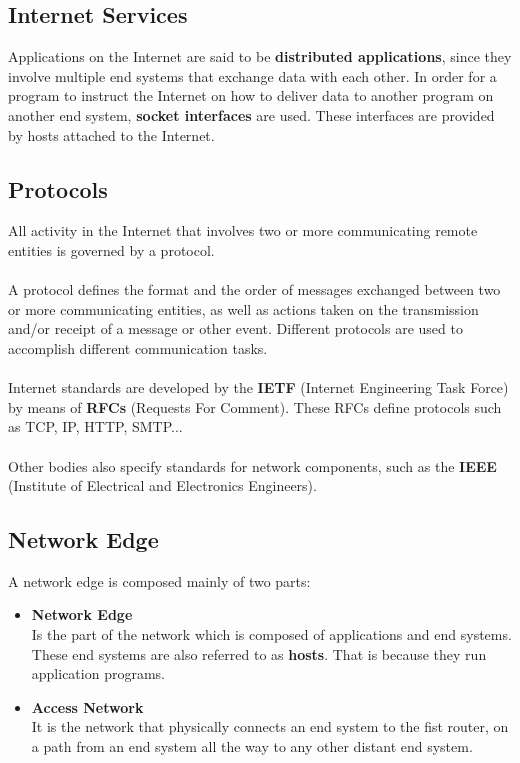 \documentclass{article}
\begin{document}
\subsection{Internet Services}
Applications on the Internet are said to be \textbf{distributed applications}, since they involve multiple end systems that exchange data with each other. In order for a program to instruct the Internet on how to deliver data to another program on another end system, \textbf{socket interfaces} are used. These interfaces are provided by hosts attached to the Internet.

\subsection{Protocols}
All activity in the Internet that involves two or more communicating remote entities is governed by a protocol. \\ \\
A protocol defines the format and the order of messages exchanged between two or more communicating entities, as well as actions taken on the transmission and/or receipt of a message or other event. Different protocols are used to accomplish different communication tasks. \\ \\
Internet standards are developed by the \textbf{IETF} (Internet Engineering Task Force) by means of \textbf{RFCs} (Requests For Comment). These RFCs define protocols such as TCP, IP, HTTP, SMTP... \\ \\
Other bodies also specify standards for network components, such as the \textbf{IEEE} (Institute of Electrical and Electronics Engineers).

\subsection{Network Edge}
A network edge is composed mainly of two parts:

\begin{itemize}
	\item \textbf{Network Edge}
	\vspace{.2cm} \\
	Is the part of the network which is composed of applications and end systems. These end systems are also referred to as \textbf{hosts}. That is because they run application programs.
	
	\item \textbf{Access Network}
	\vspace{.2cm} \\
	It is the network that physically connects an end system to the fist router, on a path from an end system all the way to any other distant end system.
\end{itemize}
\end{document}
